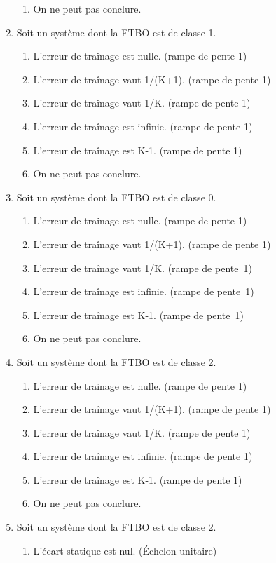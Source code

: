 \documentclass[10pt,fleqn]{article} %
\begin{document}
\begin{multicols}{2}
\begin{enumerate}
\begin{enumerate}
\item On ne peut pas conclure.  
\end{enumerate}
\item  Soit un système dont la FTBO est de classe 1.
\begin{enumerate}
\item L'erreur de traînage est nulle. (rampe de pente 1)
\item L'erreur de traînage vaut 1/(K+1). (rampe de pente 1)
\item L'erreur de traînage vaut 1/K. (rampe de pente 1) %
\item L'erreur de traînage est infinie. (rampe de pente 1)
\item L'erreur de traînage est K-1. (rampe de pente 1)
\item On ne peut pas conclure.
\end{enumerate}
\item Soit un système dont la FTBO est de classe 0.
\begin{enumerate}
\item L'erreur de trainage est nulle. (rampe de pente 1)
\item L'erreur de traînage vaut 1/(K+1). (rampe de pente 1)
\item L'erreur de traînage vaut 1/K. (rampe de pente~1)
\item L'erreur de traînage est infinie. (rampe de pente~1) %
\item L'erreur de traînage est K-1. (rampe de pente~1)
\item On ne peut pas conclure.
\end{enumerate}
\item Soit un système dont la FTBO est de classe 2.
\begin{enumerate}
\item L'erreur de trainage est nulle. (rampe de pente 1)%
\item L'erreur de traînage vaut 1/(K+1). (rampe de pente 1)
\item L'erreur de traînage vaut 1/K. (rampe de pente 1)
\item L'erreur de traînage est infinie. (rampe de pente 1) 
\item L'erreur de traînage est K-1. (rampe de pente 1)
\item On ne peut pas conclure.
\end{enumerate}
\item Soit un système dont la FTBO est de classe 2.
\begin{enumerate}
\item L'écart statique est nul. (Échelon unitaire)%

\end{enumerate}
\end{enumerate}
\end{multicols}
\end{document}

